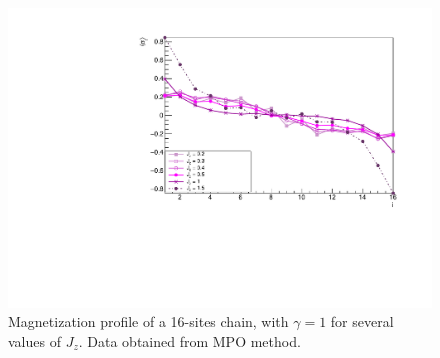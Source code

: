 





\begin{figure}[H]
    \centering
    \includegraphics[scale=0.7]{Figures/16sites/16sites_LMvsLOWJz.pdf}
    \caption{Magnetization profile of a 16-sites chain, with $\gamma = 1$ for several values of $J_z$. Data obtained from MPO method.}
    \label{fig:16sites_LMvsLOWJz}
\end{figure}

